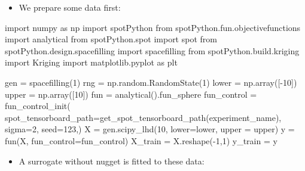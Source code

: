 \documentclass[
  letterpaper,
  DIV=11,
  numbers=noendperiod]{scrreprt}
\newenvironment{Shaded}{\begin{snugshade}}{\end{snugshade}}
\newcommand{\DecValTok}[1]{\textcolor[rgb]{0.68,0.00,0.00}{#1}}
\newcommand{\ImportTok}[1]{\textcolor[rgb]{0.00,0.46,0.62}{#1}}
\newcommand{\NormalTok}[1]{\textcolor[rgb]{0.00,0.23,0.31}{#1}}
\newcommand{\OperatorTok}[1]{\textcolor[rgb]{0.37,0.37,0.37}{#1}}
\providecommand{\tightlist}{%
  \setlength{\itemsep}{0pt}\setlength{\parskip}{0pt}}\usepackage{longtable,booktabs,array}
\begin{document}
\begin{itemize}
\tightlist
\item
  We prepare some data first:
\end{itemize}

\begin{Shaded}
\begin{Highlighting}[]
\ImportTok{import}\NormalTok{ numpy }\ImportTok{as}\NormalTok{ np}
\ImportTok{import}\NormalTok{ spotPython}
\ImportTok{from}\NormalTok{ spotPython.fun.objectivefunctions }\ImportTok{import}\NormalTok{ analytical}
\ImportTok{from}\NormalTok{ spotPython.spot }\ImportTok{import}\NormalTok{ spot}
\ImportTok{from}\NormalTok{ spotPython.design.spacefilling }\ImportTok{import}\NormalTok{ spacefilling}
\ImportTok{from}\NormalTok{ spotPython.build.kriging }\ImportTok{import}\NormalTok{ Kriging}
\ImportTok{import}\NormalTok{ matplotlib.pyplot }\ImportTok{as}\NormalTok{ plt}

\NormalTok{gen }\OperatorTok{=}\NormalTok{ spacefilling(}\DecValTok{1}\NormalTok{)}
\NormalTok{rng }\OperatorTok{=}\NormalTok{ np.random.RandomState(}\DecValTok{1}\NormalTok{)}
\NormalTok{lower }\OperatorTok{=}\NormalTok{ np.array([}\OperatorTok{{-}}\DecValTok{10}\NormalTok{])}
\NormalTok{upper }\OperatorTok{=}\NormalTok{ np.array([}\DecValTok{10}\NormalTok{])}
\NormalTok{fun }\OperatorTok{=}\NormalTok{ analytical().fun\_sphere}
\NormalTok{fun\_control }\OperatorTok{=}\NormalTok{ fun\_control\_init(}
\NormalTok{    spot\_tensorboard\_path}\OperatorTok{=}\NormalTok{get\_spot\_tensorboard\_path(experiment\_name),}
\NormalTok{    sigma}\OperatorTok{=}\DecValTok{2}\NormalTok{,}
\NormalTok{    seed}\OperatorTok{=}\DecValTok{123}\NormalTok{,)}
\NormalTok{X }\OperatorTok{=}\NormalTok{ gen.scipy\_lhd(}\DecValTok{10}\NormalTok{, lower}\OperatorTok{=}\NormalTok{lower, upper }\OperatorTok{=}\NormalTok{ upper)}
\NormalTok{y }\OperatorTok{=}\NormalTok{ fun(X, fun\_control}\OperatorTok{=}\NormalTok{fun\_control)}
\NormalTok{X\_train }\OperatorTok{=}\NormalTok{ X.reshape(}\OperatorTok{{-}}\DecValTok{1}\NormalTok{,}\DecValTok{1}\NormalTok{)}
\NormalTok{y\_train }\OperatorTok{=}\NormalTok{ y}
\end{Highlighting}
\end{Shaded}

\begin{itemize}
\tightlist
\item
  A surrogate without nugget is fitted to these data:
\end{itemize}
\end{document}
